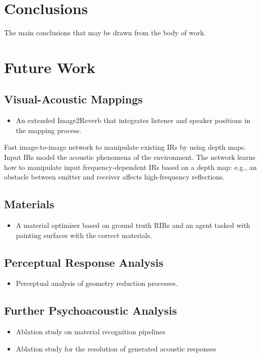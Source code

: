 \section{Conclusions}

The main conclusions that may be drawn from the body of work.

\section{Future Work}

\subsection{Visual-Acoustic Mappings}
\begin{itemize}
    \item An extended Image2Reverb that integrates listener and speaker positions in the mapping process.
\end{itemize}

Fast image-to-image network to manipulate existing IRs by using depth maps. Input IRs model the acoustic phenomena of the environment. The network learns how to manipulate input frequency-dependent IRs based on a depth map: e.g., an obstacle between emitter and receiver affects high-frequency reflections.

\subsection{Materials}
\begin{itemize}
    \item A material optimiser based on ground truth RIRs and an agent tasked with painting surfaces with the correct materials.
\end{itemize}

\subsection{Perceptual Response Analysis}

\begin{itemize}
    \item Perceptual analysis of geometry reduction processes.
\end{itemize}

\subsection{Further Psychoacoustic Analysis}

\begin{itemize}
    \item Ablation study on material recognition pipelines
    \item Ablation study for the resolution of generated acoustic responses
\end{itemize}
